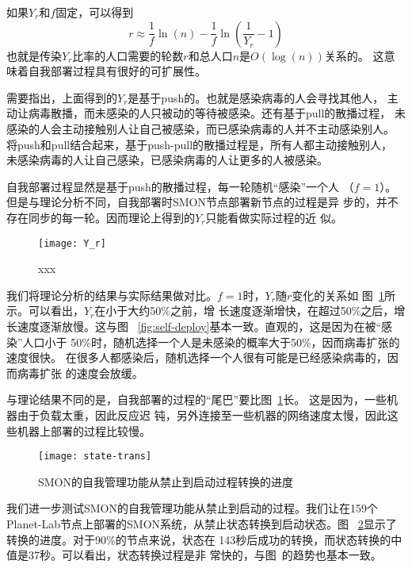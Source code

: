 如果$Y_r$和$f$固定，可以得到
\begin{equation*}
r \approx \frac{1}{f} \ln(n) - \frac{1}{f} \ln(\frac{1}{Y_r} - 1)
\end{equation*}
也就是传染$Y_r$比率的人口需要的轮数$r$和总人口$n$是$O(\log(n))$关系的。
这意味着自我部署过程具有很好的可扩展性。

需要指出，上面得到的$Y_r$是基于push的。也就是感染病毒的人会寻找其他人，
主动让病毒散播，而未感染的人只被动的等待被感染。还有基于pull的散播过程，
未感染的人会主动接触别人让自己被感染，而已感染病毒的人并不主动感染别人。
将push和pull结合起来，基于push-pull的散播过程是，所有人都主动接触别人，
未感染病毒的人让自己感染，已感染病毒的人让更多的人被感染。

自我部署过程显然是基于push的散播过程，每一轮随机“感染”一个人
（$f=1$）。但是与理论分析不同，自我部署时SMON节点部署新节点的过程是异
步的，并不存在同步的每一轮。因而理论上得到的$Y_r$只能看做实际过程的近
似。

\begin{figure}
\centering
  \begin{minipage}{0.8\linewidth}
    \centering
    \texttt{[image: Y\_r]}
    \caption{xxx}
    \label{fig:self-deploy_Yr}
  \end{minipage}
\end{figure}


我们将理论分析的结果与实际结果做对比。$f=1$时，$Y_r$随$r$变化的关系如
图~\ref{fig:self-deploy_Yr}所示。可以看出，$Y_r$在小于大约50\%之前，增
长速度逐渐增快，在超过50\%之后，增长速度逐渐放慢。这与图~
\ref{fig:self-deploy}基本一致。直观的，这是因为在被“感染”人口小于
50\%时，随机选择一个人是未感染的概率大于50\%，因而病毒扩张的速度很快。
在很多人都感染后，随机选择一个人很有可能是已经感染病毒的，因而病毒扩张
的速度会放缓。

与理论结果不同的是，自我部署的过程的“尾巴”要比图~\ref{fig:self-deploy_Yr}长。
这是因为，一些机器由于负载太重，因此反应迟
钝，另外连接至一些机器的网络速度太慢，因此这些机器上部署的过程比较慢。


\begin{figure}
\centering
  \begin{minipage}{0.8\linewidth}
    \centering
    \texttt{[image: state-trans]}
    \caption{SMON的自我管理功能从禁止到启动过程转换的进度}
    \label{fig:state-transition}
  \end{minipage}
\end{figure}

我们进一步测试SMON的自我管理功能从禁止到启动的过程。我们让在159个
Planet-Lab节点上部署的SMON系统，从禁止状态转换到启动状态。图~
\ref{fig:state-transition}显示了转换的进度。对于90\%的节点来说，状态在
143秒后成功的转换，而状态转换的中值是37秒。可以看出，状态转换过程是非
常快的，与图~\cite{xxx}的趋势也基本一致。

